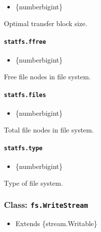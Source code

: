 \begin{itemize}
\tightlist
\item
  \{number\textbar bigint\}
\end{itemize}

Optimal transfer block size.

\paragraph{\texorpdfstring{\texttt{statfs.ffree}}{statfs.ffree}}\label{statfs.ffree}

\begin{itemize}
\tightlist
\item
  \{number\textbar bigint\}
\end{itemize}

Free file nodes in file system.

\paragraph{\texorpdfstring{\texttt{statfs.files}}{statfs.files}}\label{statfs.files}

\begin{itemize}
\tightlist
\item
  \{number\textbar bigint\}
\end{itemize}

Total file nodes in file system.

\paragraph{\texorpdfstring{\texttt{statfs.type}}{statfs.type}}\label{statfs.type}

\begin{itemize}
\tightlist
\item
  \{number\textbar bigint\}
\end{itemize}

Type of file system.

\subsubsection{\texorpdfstring{Class:
\texttt{fs.WriteStream}}{Class: fs.WriteStream}}\label{class-fs.writestream}

\begin{itemize}
\tightlist
\item
  Extends \{stream.Writable\}
\end{itemize}

